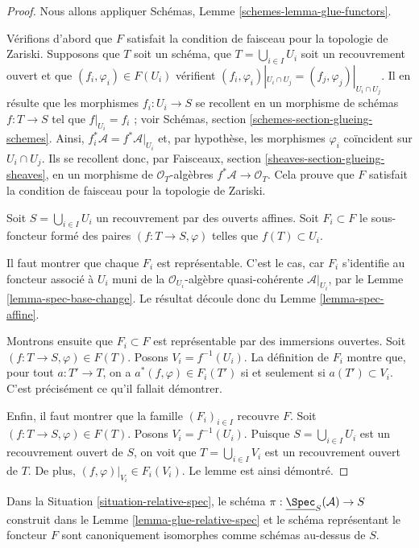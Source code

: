\begin{proof}
Nous allons appliquer Schémas, Lemme \ref{schemes-lemma-glue-functors}.

\medskip\noindent
Vérifions d'abord que $F$ satisfait la condition de faisceau pour la
topologie de Zariski. Supposons que $T$ soit un schéma,
que $T = \bigcup_{i \in I} U_i$ soit un recouvrement ouvert
et que $(f_i, \varphi_i) \in F(U_i)$ vérifient
$(f_i, \varphi_i)|_{U_i \cap U_j} = (f_j, \varphi_j)|_{U_i \cap U_j}$.
Il en résulte que les morphismes $f_i : U_i \to S$
se recollent en un morphisme de schémas $f : T \to S$ tel que
$f|_{U_i} = f_i$ ; voir Schémas, section \ref{schemes-section-glueing-schemes}.
Ainsi, $f_i^*\mathcal{A} = f^*\mathcal{A}|_{U_i}$ et, par hypothèse, les
morphismes $\varphi_i$ coïncident sur $U_i \cap U_j$. Ils se recollent donc,
par Faisceaux, section \ref{sheaves-section-glueing-sheaves}, en un
morphisme de $\mathcal{O}_T$-algèbres $f^*\mathcal{A} \to \mathcal{O}_T$.
Cela prouve que $F$ satisfait la condition de faisceau pour la topologie
de Zariski.

\medskip\noindent
Soit $S = \bigcup_{i \in I} U_i$ un recouvrement par des ouverts affines.
Soit $F_i \subset F$ le sous-foncteur formé des
paires $(f : T \to S, \varphi)$ telles que
$f(T) \subset U_i$.

\medskip\noindent
Il faut montrer que chaque $F_i$ est représentable.
C'est le cas, car $F_i$ s'identifie
au foncteur associé à $U_i$ muni de
la $\mathcal{O}_{U_i}$-algèbre quasi-cohérente $\mathcal{A}|_{U_i}$,
par le Lemme \ref{lemma-spec-base-change}.
Le résultat découle donc du Lemme \ref{lemma-spec-affine}.

\medskip\noindent
Montrons ensuite que $F_i \subset F$ est représentable par des immersions ouvertes.
Soit $(f : T \to S, \varphi) \in F(T)$. Posons $V_i = f^{-1}(U_i)$.
La définition de $F_i$ montre que, pour tout $a : T' \to T$,
on a $a^*(f, \varphi) \in F_i(T')$ si et seulement si $a(T') \subset V_i$.
C'est précisément ce qu'il fallait démontrer.

\medskip\noindent
Enfin, il faut montrer que la famille $(F_i)_{i \in I}$
recouvre $F$. Soit $(f : T \to S, \varphi) \in F(T)$.
Posons $V_i = f^{-1}(U_i)$. Puisque $S = \bigcup_{i \in I} U_i$
est un recouvrement ouvert de $S$, on voit que $T = \bigcup_{i \in I} V_i$
est un recouvrement ouvert de $T$. De plus, $(f, \varphi)|_{V_i} \in F_i(V_i)$.
Le lemme est ainsi démontré.
\end{proof}

\begin{lemma}
\label{lemma-glueing-gives-functor-spec}
Dans la Situation \ref{situation-relative-spec}, le schéma
$\pi : \underline{\Spec}_S(\mathcal{A}) \to S$
construit dans le Lemme \ref{lemma-glue-relative-spec} et le schéma
représentant le foncteur $F$ sont canoniquement isomorphes comme schémas
au-dessus de $S$.
\end{lemma}

